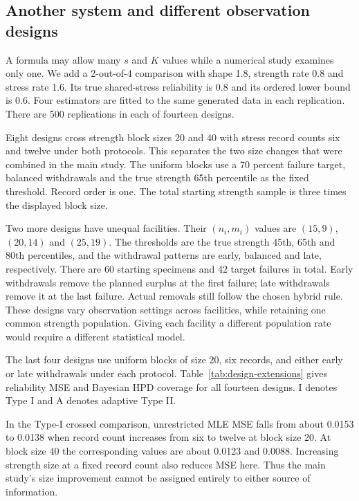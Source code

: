 \FloatBarrier

\subsection{Another system and different observation designs}\label{sec:design-extra}
A formula may allow many $s$ and $K$ values while a numerical study examines only one. We add a 2-out-of-4 comparison with shape 1.8, strength rate 0.8 and stress rate 1.6. Its true shared-stress reliability is 0.8 and its ordered lower bound is 0.6. Four estimators are fitted to the same generated data in each replication. There are 500 replications in each of fourteen designs.

Eight designs cross strength block sizes 20 and 40 with stress record counts six and twelve under both protocols. This separates the two size changes that were combined in the main study. The uniform blocks use a 70 percent failure target, balanced withdrawals and the true strength 65th percentile as the fixed threshold. Record order is one. The total starting strength sample is three times the displayed block size.

Two more designs have unequal facilities. Their $(n_i,m_i)$ values are $(15,9)$, $(20,14)$ and $(25,19)$. The thresholds are the true strength 45th, 65th and 80th percentiles, and the withdrawal patterns are early, balanced and late, respectively. There are 60 starting specimens and 42 target failures in total. Early withdrawals remove the planned surplus at the first failure; late withdrawals remove it at the last failure. Actual removals still follow the chosen hybrid rule. These designs vary observation settings across facilities, while retaining one common strength population. Giving each facility a different population rate would require a different statistical model.

The last four designs use uniform blocks of size 20, six records, and either early or late withdrawals under each protocol. Table~\ref{tab:design-extensions} gives reliability MSE and Bayesian HPD coverage for all fourteen designs. I denotes Type I and A denotes adaptive Type II.



In the Type-I crossed comparison, unrestricted MLE MSE falls from about 0.0153 to 0.0138 when record count increases from six to twelve at block size 20. At block size 40 the corresponding values are about 0.0123 and 0.0088. Increasing strength size at a fixed record count also reduces MSE here. Thus the main study's size improvement cannot be assigned entirely to either source of information.

